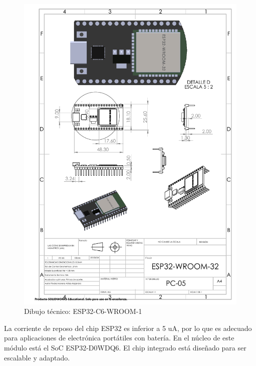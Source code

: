     \begin{figure}[H]
        \centering
        \includegraphics[trim = {7mm 1mm 1mm 1mm},clip,scale=0.4]{22/Img/esp32Dibujo.pdf}
        \caption{Dibujo técnico: ESP32-C6-WROOM-1}
        \label{fig:esp}
    \end{figure}
    
    La corriente de reposo del chip ESP32 es inferior a 5 uA, por lo que es adecuado para aplicaciones de electrónica portátiles con batería. En el núcleo de este módulo está el SoC ESP32-D0WDQ6. El chip integrado está diseñado para ser escalable y adaptado.
    
